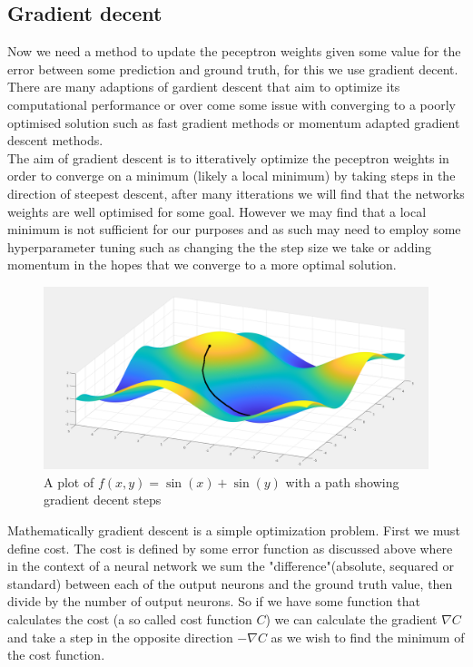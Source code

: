 \documentclass{article}
\begin{document}
\subsection{Gradient decent}
\label{sec:gradientDecent}
Now we need a method to update the peceptron weights given some value for the error between some prediction and ground truth, for this we use gradient decent. There are many adaptions of gardient descent that aim to optimize its computational performance or over come some issue with converging to a poorly optimised solution such as fast gradient methods or momentum adapted gradient descent methods. \\
The aim of gradient descent is to itteratively optimize the peceptron weights in order to converge on a minimum (likely a local minimum) by taking steps in the direction of steepest descent, after many itterations we will find that the networks weights are well optimised for some goal. However we may find that a local minimum is not sufficient for our purposes and as such may need to employ some hyperparameter tuning such as changing the the step size we take or adding momentum in the hopes that we converge to a more optimal solution.
\begin{figure}[H]
\centering
\caption{A plot of $f(x,y) = \sin(x) + \sin(y)$ with a path showing gradient decent steps}
\includegraphics[scale=0.2]{mesh.png}
\end{figure}
Mathematically gradient descent is a simple optimization problem. First we must define cost. The cost is defined by some error function as discussed above where in the context of a neural network we sum the "difference"(absolute, sequared or standard) between each of the output neurons and the ground truth value, then divide by the number of output neurons. So if we have some function that calculates the cost (a so called cost function $C$) we can calculate the gradient $\nabla C$ and take a step in the opposite direction $-\nabla C$ as we wish to find the minimum of the cost function. 
\end{document}
